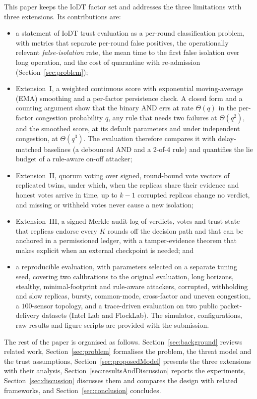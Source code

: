 \documentclass{ieeeaccess}
\begin{document}
This paper keeps the IoDT factor set and addresses the three
limitations with three extensions.  Its contributions are:
\begin{itemize}
\item a statement of IoDT trust evaluation as a per-round
classification problem, with metrics that separate per-round false
positives, the operationally relevant \emph{false-isolation} rate,
the mean time to the first false isolation over long operation, and
the cost of quarantine with re-admission (Section~\ref{sec:problem});
\item Extension~I, a weighted continuous score with exponential
moving-average (EMA) smoothing and a per-factor persistence check.
A closed form and a counting argument show that the binary AND errs at
rate $\Theta(q)$ in the per-factor congestion probability $q$, any
rule that needs two failures at $\Theta(q^{2})$, and the smoothed
score, at its default parameters and under independent congestion, at
$\Theta(q^{3})$.  The evaluation therefore compares it with
delay-matched baselines (a debounced AND and a 2-of-4 rule) and
quantifies the lie budget of a rule-aware on-off attacker;
\item Extension~II, quorum voting over signed, round-bound vote
vectors of replicated twins, under which, when the replicas share
their evidence and honest votes arrive in time, up to $k-1$ corrupted
replicas change no verdict, and missing or withheld votes never cause
a new isolation;
\item Extension~III, a signed Merkle audit log of verdicts, votes and
trust state that replicas endorse every $K$ rounds off the decision
path and that can be anchored in a permissioned ledger, with a
tamper-evidence theorem that makes explicit when an external
checkpoint is needed; and
\item a reproducible evaluation, with parameters selected on a
separate tuning seed, covering two calibrations to the original
evaluation, long horizons, stealthy, minimal-footprint and rule-aware
attackers, corrupted, withholding and slow replicas, bursty,
common-mode, cross-factor and uneven congestion, a $100$-sensor
topology, and a trace-driven evaluation on two public packet-delivery
datasets (Intel Lab and FlockLab).  The simulator, configurations, raw results and figure
scripts are provided with the submission.
\end{itemize}

The rest of the paper is organised as follows.
Section~\ref{sec:background} reviews related work,
Section~\ref{sec:problem} formalises the problem, the threat model and
the trust assumptions, Section~\ref{sec:proposedModel} presents the
three extensions with their analysis, Section~\ref{sec:resultsAndDiscussion}
reports the experiments, Section~\ref{sec:discussion} discusses them
and compares the design with related frameworks, and
Section~\ref{sec:conclusion} concludes.
\end{document}
